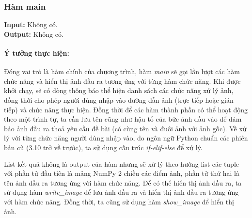 \documentclass{article}
\begin{document}
\subsubsection{Hàm main}
\textbf{Input:} Không có. \\
\textbf{Output:} Không có.
\paragraph{Ý tưởng thực hiện:} Đóng vai trò là hàm chính của chương trình, hàm \textit{main} sẽ gọi lần lượt các hàm chức năng và hiển thị ảnh đầu ra tương ứng với từng hàm chức năng. Khi được khởi chạy, sẽ có dòng thông báo thể hiện danh sách các chức năng xử lý ảnh, đồng thời cho phép người dùng nhập vào đường dẫn ảnh (trực tiếp hoặc gián tiếp) và chức năng thực hiện. Đồng thời để các hàm thành phần có thể hoạt động theo một trình tự, ta cần lưu tên cũng như hậu tố của bức ảnh đầu vào để đảm bảo ảnh đầu ra thoả yêu cầu đề bài (có cùng tên và đuôi ảnh với ảnh gốc). Về xử lý với từng chức năng người dùng nhập vào, do ngôn ngữ Python chuẩn các phiên bản cũ (3.10 trở về trước), ta sử dụng cấu trúc \textit{if-elif-else} để xử lý. \par
List kết quả không là output của hàm nhưng sẽ xử lý theo hướng list các tuple với phần tử đầu tiên là mảng NumPy 2 chiều các điểm ảnh, phần tử thứ hai là tên ảnh đầu ra tương ứng với hàm chức năng. Để có thể hiển thị ảnh đầu ra, ta sử dụng hàm \textit{write\_image} để lưu ảnh đầu ra và hiển thị ảnh đầu ra tương ứng với hàm chức năng. Đồng thời, ta cũng sử dụng hàm \textit{show\_image} để hiển thị ảnh. \par
\end{document}
